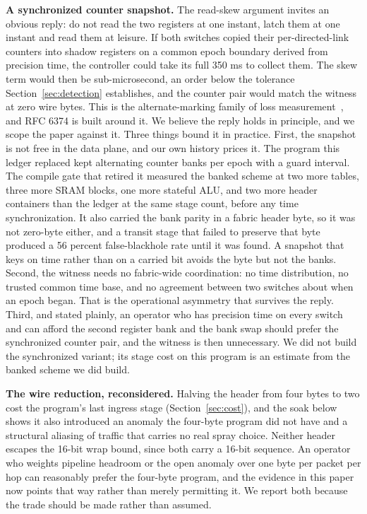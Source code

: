 \textbf{A synchronized counter snapshot.} The read-skew argument invites an obvious reply: do not read the two registers at one instant, latch them at one instant and read them at leisure. If both switches copied their per-directed-link counters into shadow registers on a common epoch boundary derived from precision time, the controller could take its full 350 ms to collect them. The skew term would then be sub-microsecond, an order below the tolerance Section~\ref{sec:detection} establishes, and the counter pair would match the witness at zero wire bytes. This is the alternate-marking family of loss measurement~\cite{rfc9341}, and RFC 6374 is built around it. We believe the reply holds in principle, and we scope the paper against it. Three things bound it in practice. First, the snapshot is not free in the data plane, and our own history prices it. The program this ledger replaced kept alternating counter banks per epoch with a guard interval. The compile gate that retired it measured the banked scheme at two more tables, three more SRAM blocks, one more stateful ALU, and two more header containers than the ledger at the same stage count, before any time synchronization. It also carried the bank parity in a fabric header byte, so it was not zero-byte either, and a transit stage that failed to preserve that byte produced a 56 percent false-blackhole rate until it was found. A snapshot that keys on time rather than on a carried bit avoids the byte but not the banks. Second, the witness needs no fabric-wide coordination: no time distribution, no trusted common time base, and no agreement between two switches about when an epoch began. That is the operational asymmetry that survives the reply. Third, and stated plainly, an operator who has precision time on every switch and can afford the second register bank and the bank swap should prefer the synchronized counter pair, and the witness is then unnecessary. We did not build the synchronized variant; its stage cost on this program is an estimate from the banked scheme we did build.

\textbf{The wire reduction, reconsidered.} Halving the header from four bytes to two cost the program's last ingress stage (Section~\ref{sec:cost}), and the soak below shows it also introduced an anomaly the four-byte program did not have and a structural aliasing of traffic that carries no real spray choice. Neither header escapes the 16-bit wrap bound, since both carry a 16-bit sequence. An operator who weights pipeline headroom or the open anomaly over one byte per packet per hop can reasonably prefer the four-byte program, and the evidence in this paper now points that way rather than merely permitting it. We report both because the trade should be made rather than assumed.


